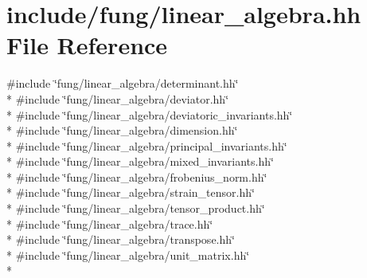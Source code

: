 \hypertarget{linear__algebra_8hh}{\section{include/fung/linear\-\_\-algebra.hh File Reference}
\label{linear__algebra_8hh}
}
{\ttfamily \#include \char`\"{}fung/linear\-\_\-algebra/determinant.\-hh\char`\"{}}\\*
{\ttfamily \#include \char`\"{}fung/linear\-\_\-algebra/deviator.\-hh\char`\"{}}\\*
{\ttfamily \#include \char`\"{}fung/linear\-\_\-algebra/deviatoric\-\_\-invariants.\-hh\char`\"{}}\\*
{\ttfamily \#include \char`\"{}fung/linear\-\_\-algebra/dimension.\-hh\char`\"{}}\\*
{\ttfamily \#include \char`\"{}fung/linear\-\_\-algebra/principal\-\_\-invariants.\-hh\char`\"{}}\\*
{\ttfamily \#include \char`\"{}fung/linear\-\_\-algebra/mixed\-\_\-invariants.\-hh\char`\"{}}\\*
{\ttfamily \#include \char`\"{}fung/linear\-\_\-algebra/frobenius\-\_\-norm.\-hh\char`\"{}}\\*
{\ttfamily \#include \char`\"{}fung/linear\-\_\-algebra/strain\-\_\-tensor.\-hh\char`\"{}}\\*
{\ttfamily \#include \char`\"{}fung/linear\-\_\-algebra/tensor\-\_\-product.\-hh\char`\"{}}\\*
{\ttfamily \#include \char`\"{}fung/linear\-\_\-algebra/trace.\-hh\char`\"{}}\\*
{\ttfamily \#include \char`\"{}fung/linear\-\_\-algebra/transpose.\-hh\char`\"{}}\\*
{\ttfamily \#include \char`\"{}fung/linear\-\_\-algebra/unit\-\_\-matrix.\-hh\char`\"{}}\\*
